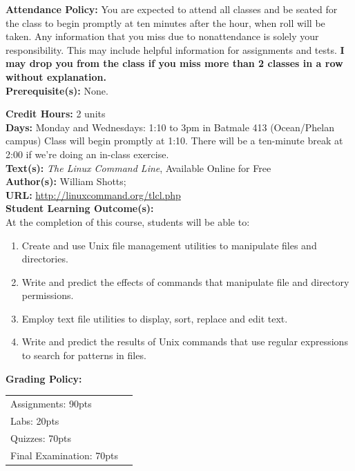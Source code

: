 \documentclass[11pt]{article}
\begin{document}
\textbf {Attendance Policy:} You are expected to attend all classes and be
seated for the class to begin promptly at ten minutes after the hour, when roll
will be taken. Any information
that you miss due to nonattendance is solely your responsibility. This may
include helpful information for assignments and tests. {\bf I may drop you from
the class if you miss more than 2 classes in a row without explanation.}\\

\textbf {Prerequisite(s):} None.

\textbf {Credit Hours:} 2 units\\
\textbf {Days:} Monday and Wednesdays: 1:10 to 3pm in Batmale 413 (Ocean/Phelan campus)
Class will begin promptly at 1:10. There will be a ten-minute break at 2:00 if we're doing an in-class exercise.\\
\textbf {\large Text(s):} \emph{The Linux Command Line}, Available Online for Free\\
\textbf {Author(s):} William Shotts;\\
\textbf {URL:} \url{http://linuxcommand.org/tlcl.php} \\

\textbf {\large Student Learning Outcome(s):} \\
At the completion of this course, students will be able to:
\begin{enumerate} \itemsep-0.4em
  \item Create and use Unix file management utilities to manipulate files and directories.
  \item Write and predict the effects of commands that manipulate file and directory permissions.
  \item Employ text file utilities to display, sort, replace and edit text.
  \item Write and predict the results of Unix commands that use regular expressions to search for patterns in files.
\end{enumerate}

\textbf {\large Grading Policy:} \\
\hspace*{40mm}
\begin{tabular}{ l l }
  Assignments: 90pts \\
  Labs: 20pts \\
  Quizzes: 70pts \\
  Final Examination: 70pts \\
\end{tabular} \\\\
\end{document}

